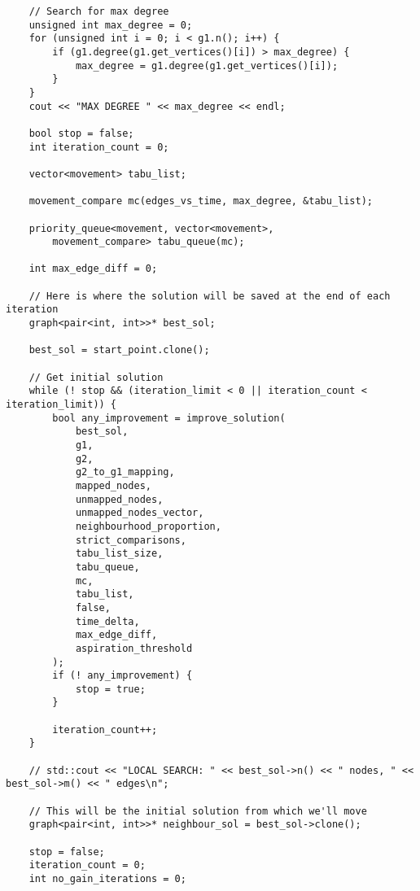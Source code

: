 \begin{lstlisting}
    // Search for max degree
    unsigned int max_degree = 0;
    for (unsigned int i = 0; i < g1.n(); i++) {
        if (g1.degree(g1.get_vertices()[i]) > max_degree) {
            max_degree = g1.degree(g1.get_vertices()[i]);
        }
    }
    cout << "MAX DEGREE " << max_degree << endl;

    bool stop = false;
    int iteration_count = 0;

    vector<movement> tabu_list;

    movement_compare mc(edges_vs_time, max_degree, &tabu_list);

    priority_queue<movement, vector<movement>,
        movement_compare> tabu_queue(mc);

    int max_edge_diff = 0;

    // Here is where the solution will be saved at the end of each iteration
    graph<pair<int, int>>* best_sol;

    best_sol = start_point.clone();

    // Get initial solution
    while (! stop && (iteration_limit < 0 || iteration_count < iteration_limit)) {
        bool any_improvement = improve_solution(
            best_sol,
            g1,
            g2,
            g2_to_g1_mapping,
            mapped_nodes,
            unmapped_nodes,
            unmapped_nodes_vector,
            neighbourhood_proportion,
            strict_comparisons,
            tabu_list_size,
            tabu_queue,
            mc,
            tabu_list,
            false,
            time_delta,
            max_edge_diff,
            aspiration_threshold
        );
        if (! any_improvement) {
            stop = true;
        }

        iteration_count++;
    }

    // std::cout << "LOCAL SEARCH: " << best_sol->n() << " nodes, " << best_sol->m() << " edges\n";

    // This will be the initial solution from which we'll move
    graph<pair<int, int>>* neighbour_sol = best_sol->clone();

    stop = false;
    iteration_count = 0;
    int no_gain_iterations = 0;


\end{lstlisting}

